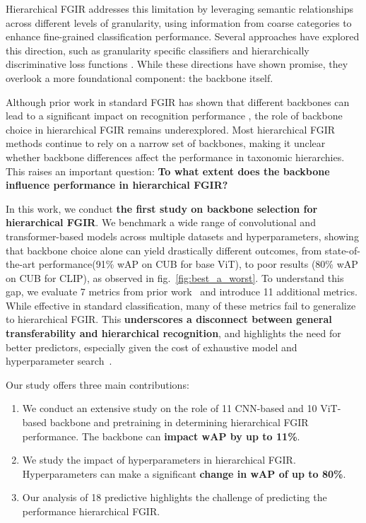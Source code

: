 \documentclass[10pt,twocolumn]{article}
\begin{document}
Hierarchical FGIR addresses this limitation by leveraging semantic relationships across different levels of granularity, using information from coarse categories to enhance fine-grained classification performance. Several approaches have explored this direction, such as granularity specific classifiers \cite{chang_your_2021} and hierarchically discriminative loss functions \cite{chen_fine-grained_2018}. While these directions have shown promise, they overlook a more foundational component: the backbone itself.

Although prior work in standard FGIR has shown that different backbones can lead to a significant impact on recognition performance \cite{ye_image_2024}, the role of backbone choice in hierarchical FGIR remains underexplored. Most hierarchical FGIR methods continue to rely on a narrow set of backbones\cite{wang_multiple_2015, cerri_reduction_2016, chen_fine-grained_2018, chang_your_2021, chen_label_2022, chen_hierarchically_2024}, making it unclear whether backbone differences affect the performance in taxonomic hierarchies. This raises an important question: \textbf{To what extent does the backbone influence performance in hierarchical FGIR?}

In this work, we conduct \textbf{the first study on backbone selection for hierarchical FGIR}. We benchmark a wide range of convolutional and transformer-based models across multiple datasets and hyperparameters, showing that backbone choice alone can yield drastically different outcomes, from state-of-the-art performance(91\% wAP on CUB for base ViT), to poor results (80\% wAP on CUB for CLIP), as observed in  fig.~\ref{fig:best_a_worst}. To understand this gap, we evaluate 7 metrics from prior work~\cite{kornblith_better_2019, nayman_diverse_2022} and introduce 11 additional metrics. While effective in standard classification, many of these metrics fail to generalize to hierarchical FGIR. This \textbf{underscores a disconnect between general transferability and hierarchical recognition}, and highlights the need for better predictors, especially given the cost of exhaustive model and hyperparameter search~\cite{strubell_energy_2019, lacoste_quantifying_2019}.

Our study offers three main contributions: 
\begin{enumerate}[topsep=3pt, itemsep=2pt, parsep=1pt]
    \item We conduct an extensive study on the role of 11 CNN-based and 10 ViT-based backbone and pretraining in determining hierarchical FGIR performance. The backbone can \textbf{impact wAP by up to 11\%}.
    \item We study the impact of hyperparameters in hierarchical FGIR. Hyperparameters can make a significant \textbf{change in wAP of up to 80\%}.
    \item Our analysis of 18 predictive highlights the challenge of predicting the performance hierarchical FGIR.
\end{enumerate}
\end{document}
